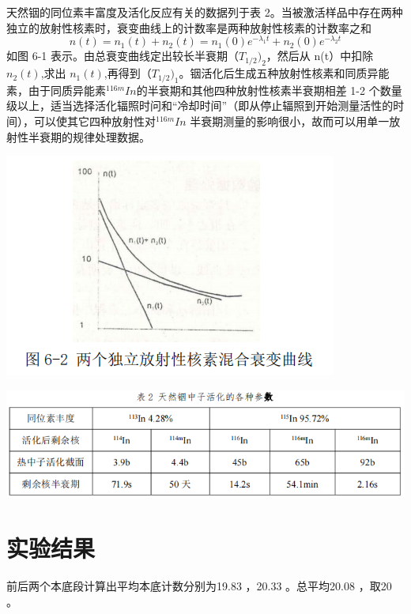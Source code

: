 \documentclass[hyperref]{ctexart}
\begin{document}
\begin{multicols}{2}
	天然铟的同位素丰富度及活化反应有关的数据列于表 2。当被激活样品中存在两种独立的放射性核素时，衰变曲线上的计数率是两种放射性核素的计数率之和
	\begin{equation}
	n(t)=n_1(t)+n_2(t)=n_1(0)e^{-\lambda_1 t}+n_2(0)e^{-\lambda_2 t}\label{hai}
	\end{equation}
	如图 6-1 表示。由总衰变曲线定出较长半衰期$（T_{1/2})_2$，然后从 n(t）中扣除$n_2(t)$,求出 $n_1(t)$,再得到$（T_{1/2})_1$。铟活化后生成五种放射性核素和同质异能素，由于同质异能素$^{116m}In$的半衰期和其他四种放射性核素半衰期相差 1-2 个数量级以上，适当选择活化辐照时问和“冷却时间”（即从停止辐照到开始测量活性的时间），可以使其它四种放射性对$^{116m}In$ 半衰期测量的影响很小，故而可以用单一放射性半衰期的规律处理数据。
	\begin{center}\includegraphics[scale=0.5]{t62}\end{center}
	\begin{center}\includegraphics[scale=0.3]{b62}\end{center}

	\section{实验结果}
	前后两个本底段计算出平均本底计数分别为19.83 ，20.33 。总平均20.08 ，取20 。


\end{multicols}
\end{document}
